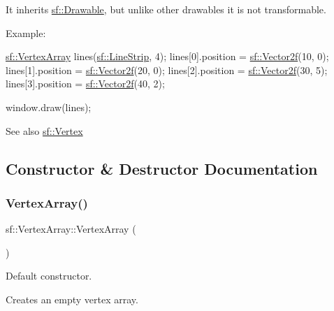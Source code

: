 It inherits \hyperlink{classsf_1_1_drawable}{sf\+::\+Drawable}, but unlike other drawables it is not transformable.

Example\+: 
\begin{DoxyCode}
\hyperlink{classsf_1_1_vertex_array}{sf::VertexArray} lines(\hyperlink{group__graphics_gga5ee56ac1339984909610713096283b1ba14d9eeec2c7c314f239a57bde35949fa}{sf::LineStrip}, 4);
lines[0].position = \hyperlink{classsf_1_1_vector2}{sf::Vector2f}(10, 0);
lines[1].position = \hyperlink{classsf_1_1_vector2}{sf::Vector2f}(20, 0);
lines[2].position = \hyperlink{classsf_1_1_vector2}{sf::Vector2f}(30, 5);
lines[3].position = \hyperlink{classsf_1_1_vector2}{sf::Vector2f}(40, 2);

window.draw(lines);
\end{DoxyCode}


\begin{DoxySeeAlso}{See also}
\hyperlink{classsf_1_1_vertex}{sf\+::\+Vertex} 
\end{DoxySeeAlso}


\subsection{Constructor \& Destructor Documentation}
\mbox{\label{classsf_1_1_vertex_array_a15729e01df8fc0021f9774dfb56295c1}} 
\subsubsection{\texorpdfstring{Vertex\+Array()}{VertexArray()}\hspace{0.1cm}{\footnotesize\ttfamily [1/2]}}
{\footnotesize\ttfamily sf\+::\+Vertex\+Array\+::\+Vertex\+Array (\begin{DoxyParamCaption}{ }\end{DoxyParamCaption})}



Default constructor. 

Creates an empty vertex array. \mbox{\label{classsf_1_1_vertex_array_a4bb1c29a0e3354a035075899d84f02f9}} 
